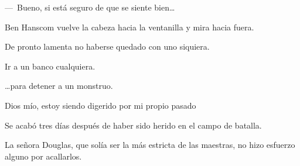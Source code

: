 \sk
---~Bueno, si está seguro de que se siente
bien\ldots{} 

\sk
Ben Hanscom vuelve la cabeza hacia la
ventanilla y mira hacia fuera. 

\sk
De pronto lamenta
no haberse quedado con uno siquiera. 

\sk
Ir a un banco cualquiera. 

\sk
\ldots{}para detener a un monstruo. 

\sk
Dios mío, estoy siendo digerido por mi
propio pasado 

\sk
Se acabó tres días después de haber sido herido en el campo de batalla. 

\sk
La señora Douglas, que solía ser la más
estricta de las maestras, no hizo esfuerzo alguno
por acallarlos. 

\sk
\nb{}

\sk
\nb{}

\sk
\nb{}

\sk
\nb{}

\sk
\nb{}

\sk
\nb{}

\sk
\nb{}

\sk
\nb{}

\nb{}

\sk
\nb{}

\sk
\nb{}

\sk
\nb{}

\sk
\nb{}

\sk
\nb{}

\sk
\nb{}

\sk
\nb{}

\sk
\nb{}

\sk
\nb{}

\sk
\nb{}

\sk
\nb{}

\sk
\nb{}

\sk
\nb{}

\sk
\nb{}

\sk
\nb{}

\sk
\nb{}

\sk
\nb{}

\sk
\nb{}

\sk
\nb{}


